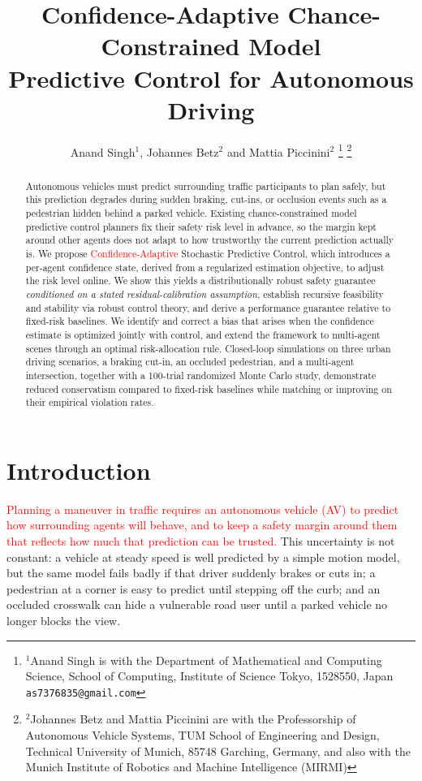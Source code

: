 \documentclass[letterpaper, 10 pt, conference]{ieeeconf}
\title{\LARGE \bf Confidence-Adaptive Chance-Constrained Model \\ Predictive Control for Autonomous Driving}
\author{
Anand Singh$^{1}$, Johannes Betz$^{2}$ and Mattia Piccinini$^{2}$%
\thanks{$^{1}$Anand Singh is with the Department of Mathematical and Computing Science,
School of Computing, Institute of Science Tokyo, 1528550, Japan
{\tt\small as7376835@gmail.com}}%
\thanks{$^{2}$Johannes Betz and Mattia Piccinini are with the Professorship of Autonomous Vehicle Systems,
TUM School of Engineering and Design, Technical University of Munich,
85748 Garching, Germany, and also with the Munich Institute of Robotics
and Machine Intelligence (MIRMI)}%
}
\begin{document}
\maketitle
\thispagestyle{empty}
\pagestyle{empty}
\begin{abstract}
Autonomous vehicles must predict surrounding traffic participants to plan safely, but this prediction degrades during sudden braking, cut-ins, or occlusion events such as a pedestrian hidden behind a parked vehicle. Existing chance-constrained model predictive control planners fix their safety risk level in advance, so the margin kept around other agents does not adapt to how trustworthy the current prediction actually is. We propose \textcolor{red}{Confidence-Adaptive} Stochastic Predictive Control, which introduces a per-agent confidence state, derived from a regularized estimation objective, to adjust the risk level online. We show this yields a distributionally robust safety guarantee \emph{conditioned on a stated residual-calibration assumption}, establish recursive feasibility and stability via robust control theory, and derive a performance guarantee relative to fixed-risk baselines. We identify and correct a bias that arises when the confidence estimate is optimized jointly with control, and extend the framework to multi-agent scenes through an optimal risk-allocation rule. Closed-loop simulations on three urban driving scenarios, a braking cut-in, an occluded pedestrian, and a multi-agent intersection, together with a 100-trial randomized Monte Carlo study, demonstrate reduced conservatism compared to fixed-risk baselines while matching or improving on their empirical violation rates\textcolor{red}{.}
\end{abstract}
\section{Introduction}

\textcolor{red}{Planning a maneuver in traffic requires an autonomous vehicle (AV) to predict how surrounding agents will behave, and to keep a safety margin around them that reflects how much that prediction can be trusted.} This uncertainty is not constant: a vehicle at steady speed is well predicted by a simple motion model, but the same model fails badly if that driver suddenly brakes or cuts in; a pedestrian at a corner is easy to predict until stepping off the curb; and an occluded crosswalk can hide a vulnerable road user until a parked vehicle no longer blocks the view.
\end{document}
